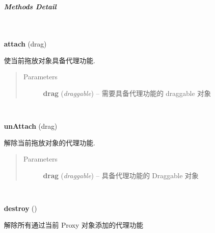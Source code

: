 \documentclass[letterpaper,10pt,english]{sphinxmanual}
\begin{document}
\subparagraph{Methods Detail}
\label{api/component/dd/proxy:methods-detail}

\begin{fulllineitems}
\label{api/component/dd/proxy:Proxy.attach}~
\begin{DUlineblock}{0em}
\item[] \textbf{attach} (drag)
\item[] 使当前拖放对象具备代理功能.
\end{DUlineblock}
\begin{quote}\begin{description}
\item[{Parameters}] \leavevmode
\textbf{drag} (\emph{draggable}) -- 需要具备代理功能的 draggable 对象

\end{description}\end{quote}

\end{fulllineitems}



\begin{fulllineitems}
\label{api/component/dd/proxy:Proxy.unAttach}~
\begin{DUlineblock}{0em}
\item[] \textbf{unAttach} (drag)
\item[] 解除当前拖放对象的代理功能.
\end{DUlineblock}
\begin{quote}\begin{description}
\item[{Parameters}] \leavevmode
\textbf{drag} (\emph{draggable}) -- 具备代理功能的 Draggable 对象

\end{description}\end{quote}

\end{fulllineitems}



\begin{fulllineitems}
\label{api/component/dd/proxy:Proxy.destroy}~
\begin{DUlineblock}{0em}
\item[] \textbf{destroy} ()
\item[] 解除所有通过当前 Proxy 对象添加的代理功能
\end{DUlineblock}

\end{fulllineitems}
\end{document}

